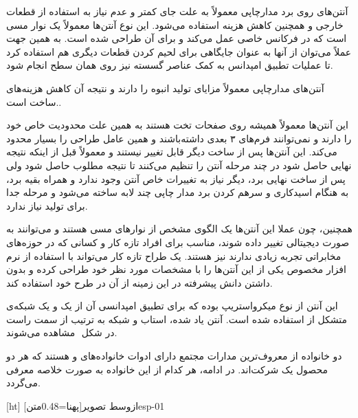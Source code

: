 
آنتن‌های روی برد مدارچاپی معمولاً به علت جای کمتر و عدم نیاز به استفاده از قطعات خارجی و همچنین کاهش هزینه استفاده می‌شود. این نوع آنتن‌ها معمولاً یک نوار مسی است که در فرکانس خاصی عمل می‌کند و برای آن طراحی شده است. به همین جهت عملاً می‌توان از آنها به عنوان جایگاهی برای لحیم کردن قطعات دیگری هم استفاده کرد تا عملیات تطبیق امپدانس به کمک عناصر گسسته نیز روی همان سطح انجام شود.

آنتن‌های مدارچاپی معمولاً مزایای تولید انبوه را دارند و نتیجه آن کاهش هزینه‌های ساخت است..


این آنتن‌ها معمولاً همیشه روی صفحات تخت هستند به همین علت محدودیت خاص خود را دارند و نمی‌توانند فرم‌های ۳ بعدی داشته‌باشند و همین عامل طراحی را بسیار محدود می‌کند. این آنتن‌ها پس از ساخت دیگر قابل تغییر نیستند و معمولاً قبل از اینکه نتیجه نهایی حاصل شود در چند مرحله آنتن را تنظیم می‌کنند تا نتیجه مطلوب حاصل شود ولی پس از ساخت نهایی برد، دیگر نیاز به تغییرات خاص آنتن وجود ندارد و همراه بقیه برد، به هنگام اسیدکاری و سرهم کردن برد مدار چاپی چند لابه ساخته می‌شود و مرحله جدا برای تولید نیاز ندارد.

همچنین، چون عملا این آنتن‌ها یک الگوی مشخص از نوارهای مسی هستند و می‌توانند به صورت دیجیتالی تغییر داده شوند، مناسب برای افراد تازه کار و کسانی که در حوزه‌های مخابراتی تجربه زیادی ندارند نیز هستند. یک طراح تازه کار می‌تواند با استفاده از نرم افزار مخصوص یکی از این آنتن‌ها را با مشخصات مورد نظر خود طراحی کرده و بدون داشتن دانش پیشرفته در این زمینه از آن در طرح خود استفاده کند.


این آنتن از نوع میکرواستریپ بوده که برای تطبیق امپدانسی آن از یک  و یک شبکه‌ی متشکل از  استفاده شده است. آنتن یاد شده، استاب و شبکه به ترتیب از سمت راست در شکل ‌ مشاهده می‌شوند.


دو خانواده از معروف‌ترین مدارات مجتمع دارای ادوات  خانواده‌های  و  هستند که هر دو محصول یک شرکت‌اند. در ادامه، هر کدام از این خانواده به صورت خلاصه معرفی می‌گردد.


[ht]
‌ازوسط
‌تصویر[پهنا=0.48‌متن]{esp-01}

